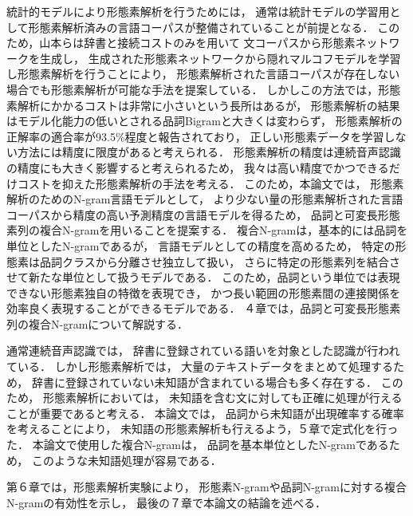 統計的モデルにより形態素解析を行うためには，
通常は統計モデルの学習用として形態素解析済みの言語コーパスが整備されていることが前提となる．
このため，山本らは\cite{Yamamoto}辞書と接続コストのみを用いて
文コーパスから形態素ネットワークを生成し，
生成された形態素ネットワークから隠れマルコフモデルを学習し形態素解析を行うことにより，
形態素解析された言語コーパスが存在しない場合でも形態素解析が可能な手法を提案している．
しかしこの方法では，形態素解析にかかるコストは非常に小さいという長所はあるが，
形態素解析の結果はモデル化能力の低いとされる品詞Bigramと大きくは変わらず，
形態素解析の正解率の適合率が93.5\%程度と報告されており，
正しい形態素データを学習しない方法には精度に限度があると考えられる．
形態素解析の精度は連続音声認識の精度にも大きく影響すると考えられるため，
我々は高い精度でかつできるだけコストを抑えた形態素解析の手法を考える．
このため，本論文では，
形態素解析のためのN-gram言語モデルとして，
より少ない量の形態素解析された言語コーパスから精度の高い予測精度の言語モデルを得るため，
品詞と可変長形態素列の複合N-gram\cite{Masataki}を用いることを提案する．
複合N-gramは，基本的には品詞を単位としたN-gramであるが，
言語モデルとしての精度を高めるため，
特定の形態素は品詞クラスから分離させ独立して扱い，
さらに特定の形態素列を結合させて新たな単位として扱うモデルである．
このため，品詞という単位では表現できない形態素独自の特徴を表現でき，
かつ長い範囲の形態素間の連接関係を効率良く表現することができるモデルである．
４章では，品詞と可変長形態素列の複合N-gramについて解説する．

通常連続音声認識では，
辞書に登録されている語いを対象とした認識が行われている．
しかし形態素解析では，
大量のテキストデータをまとめて処理するため，
辞書に登録されていない未知語が含まれている場合も多く存在する．
このため，
形態素解析においては，
未知語を含む文に対しても正確に処理が行えることが重要であると考える．
本論文では，
品詞から未知語が出現確率する確率を考えることにより，
未知語の形態素解析も行えるよう，５章で定式化を行った．
本論文で使用した複合N-gramは，
品詞を基本単位としたN-gramであるため，
このような未知語処理が容易である．

第６章では，形態素解析実験により，
形態素N-gramや品詞N-gramに対する複合N-gramの有効性を示し，
最後の７章で本論文の結論を述べる．



